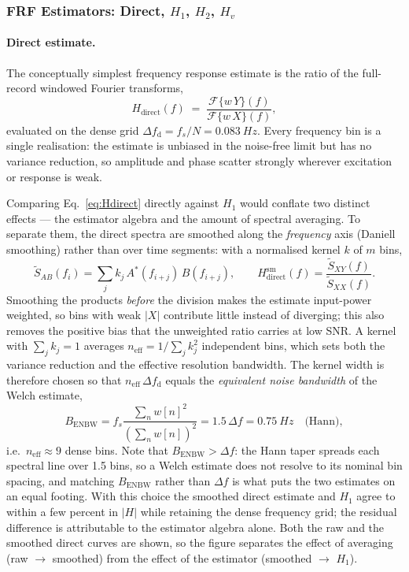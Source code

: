 \subsubsection{FRF Estimators: Direct, $H_1$, $H_2$, $H_v$}
\label{sec:proc:estimators}

\paragraph{Direct estimate.}
The conceptually simplest frequency response estimate is the ratio of the
full-record windowed Fourier transforms,
\begin{equation}
  H_\mathrm{direct}(f) \;=\;
  \frac{\mathcal{F}\{w\,Y\}(f)}{\mathcal{F}\{w\,X\}(f)} ,
  \label{eq:Hdirect}
\end{equation}
evaluated on the dense grid $\Delta f_\mathrm{d} = f_s/N = \SI{0.083}{Hz}$.
Every frequency bin is a single realisation: the estimate is unbiased in the
noise-free limit but has no variance reduction, so amplitude and phase
scatter strongly wherever excitation or response is weak.

Comparing Eq.~\eqref{eq:Hdirect} directly against $H_1$ would conflate two
distinct effects — the estimator algebra and the amount of spectral averaging.
To separate them, the direct spectra are smoothed along the \emph{frequency}
axis (Daniell smoothing) rather than over time segments: with a normalised
kernel $k$ of $m$ bins,
\begin{equation}
  \tilde S_{AB}(f_i) = \sum_{j} k_j\, A^*(f_{i+j})\, B(f_{i+j}),
  \qquad
  H_\mathrm{direct}^{\mathrm{sm}}(f) = \frac{\tilde S_{XY}(f)}{\tilde S_{XX}(f)} .
  \label{eq:Hdirectsmooth}
\end{equation}
Smoothing the products \emph{before} the division makes the estimate
input-power weighted, so bins with weak $|X|$ contribute little instead of
diverging; this also removes the positive bias that the unweighted ratio
carries at low SNR. A kernel with $\sum_j k_j = 1$ averages
$n_\mathrm{eff} = 1/\sum_j k_j^2$ independent bins, which sets both the
variance reduction and the effective resolution bandwidth. The kernel width is
therefore chosen so that $n_\mathrm{eff}\,\Delta f_\mathrm{d}$ equals the
\emph{equivalent noise bandwidth} of the Welch estimate,
\begin{equation}
  B_\mathrm{ENBW} = f_s \frac{\sum_n w[n]^2}{\left(\sum_n w[n]\right)^2}
  = 1.5\,\Delta f = \SI{0.75}{Hz}
  \quad\text{(Hann)},
  \label{eq:enbw}
\end{equation}
i.e.\ $n_\mathrm{eff} \approx 9$ dense bins. Note that
$B_\mathrm{ENBW} > \Delta f$: the Hann taper spreads each spectral line over
1.5 bins, so a Welch estimate does not resolve to its nominal bin spacing, and
matching $B_\mathrm{ENBW}$ rather than $\Delta f$ is what puts the two
estimates on an equal footing. With this choice the smoothed direct estimate
and $H_1$ agree to within a few percent in $|H|$ while retaining the dense
frequency grid; the residual difference is attributable to the estimator
algebra alone. Both the raw and the smoothed direct curves are shown, so the
figure separates the effect of averaging (raw $\to$ smoothed) from the effect
of the estimator (smoothed $\to$ $H_1$).

